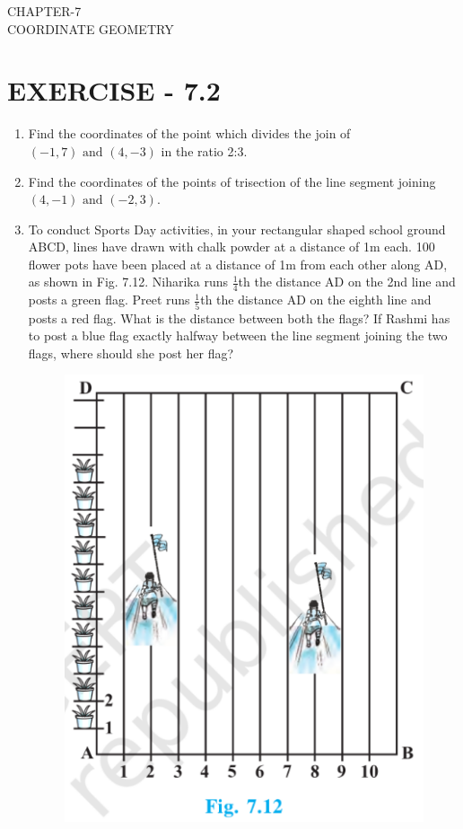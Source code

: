 \documentclass[12pt]{article}
\begin{document}
\begin{center}
\textbf\large{CHAPTER-7 \\ COORDINATE GEOMETRY}
\end{center}

\section*{EXERCISE - 7.2}
\begin{enumerate}

\item Find the coordinates of the point which divides the join of $(-1,7) \text{ and } (4,-3)$ in the ratio 2:3.
\item Find the coordinates of the points of trisection of the line segment joining $(4,-1) \text{ and } (-2,3)$.

\item To conduct Sports Day activities, in your rectangular shaped school                   
ground ABCD, lines have 
drawn with chalk powder at a                 
distance of 1m each. 100 flower pots have been placed at a distance of 1m 
from each other along AD, as shown 
in Fig. 7.12. Niharika runs $ \frac {1}{4} $th the 
distance AD on the 2nd line and 
posts a green flag. Preet runs $ \frac {1}{5} $th 
the distance AD on the eighth line 
and posts a red flag. What is the 
distance between both the flags? If 
Rashmi has to post a blue flag exactly 
halfway between the line segment 
joining the two flags, where should 
she post her flag?
\begin{figure}[h!]
  \centering
  \includegraphics[width=\columnwidth]{./figures/sc.png}
  \caption{}
\label{fig:10/7/12Fig1}
\end{figure}               
      

\end{enumerate}
\end{document}
